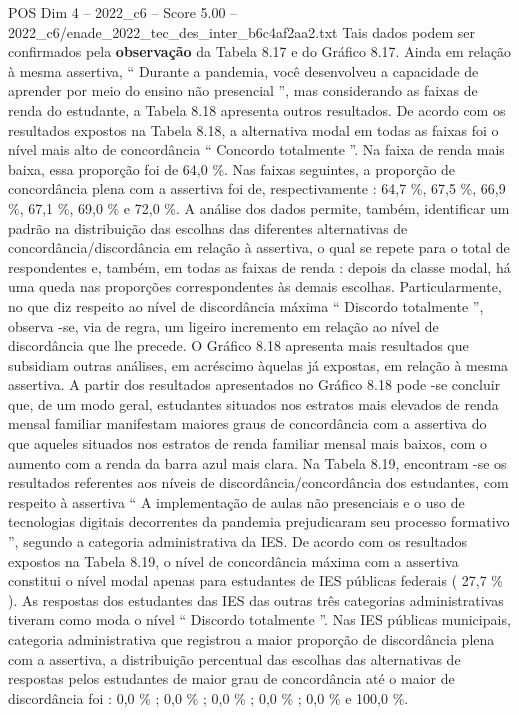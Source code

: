 \begin{textsample}{POS Dim 4 – 2022\_c6 – Score 5.00 – 2022\_c6/enade\_2022\_tec\_des\_inter\_b6c4af2aa2.txt}
Tais dados podem ser confirmados pela \textbf{observação} da Tabela 8.17 e do Gráfico 8.17.
Ainda em relação à mesma assertiva, “ Durante a pandemia, você desenvolveu a capacidade de aprender por meio do ensino não presencial ”, mas considerando as faixas de renda do estudante, a Tabela 8.18 apresenta outros resultados.
De acordo com os resultados expostos na Tabela 8.18, a alternativa modal em todas as faixas foi o nível mais alto de concordância “ Concordo totalmente ”.
Na faixa de renda mais baixa, essa proporção foi de 64,0 \%.
Nas faixas seguintes, a proporção de concordância plena com a assertiva foi de, respectivamente : 64,7 \%, 67,5 \%, 66,9 \%, 67,1 \%, 69,0 \% e 72,0 \%.
A análise dos dados permite, também, identificar um padrão na distribuição das escolhas das diferentes alternativas de concordância/discordância em relação à assertiva, o qual se repete para o total de respondentes e, também, em todas as faixas de renda : depois da classe modal, há uma queda nas proporções correspondentes às demais escolhas.
Particularmente, no que diz respeito ao nível de discordância máxima “ Discordo totalmente ”, observa -se, via de regra, um ligeiro incremento em relação ao nível de discordância que lhe precede.
O Gráfico 8.18 apresenta mais resultados que subsidiam outras análises, em acréscimo àquelas já expostas, em relação à mesma assertiva.
A partir dos resultados apresentados no Gráfico 8.18 pode -se concluir que, de um modo geral, estudantes situados nos estratos mais elevados de renda mensal familiar manifestam maiores graus de concordância com a assertiva do que aqueles situados nos estratos de renda familiar mensal mais baixos, com o aumento com a renda da barra azul mais clara.
Na Tabela 8.19, encontram -se os resultados referentes aos níveis de discordância/concordância dos estudantes, com respeito à assertiva “ A implementação de aulas não presenciais e o uso de tecnologias digitais decorrentes da pandemia prejudicaram seu processo formativo ”, segundo a categoria administrativa da IES.
De acordo com os resultados expostos na Tabela 8.19, o nível de concordância máxima com a assertiva constitui o nível modal apenas para estudantes de IES públicas federais ( 27,7 \% ).
As respostas dos estudantes das IES das outras três categorias administrativas tiveram como moda o nível “ Discordo totalmente ”.
Nas IES públicas municipais, categoria administrativa que registrou a maior proporção de discordância plena com a assertiva, a distribuição percentual das escolhas das alternativas de respostas pelos estudantes de maior grau de concordância até o maior de discordância foi : 0,0 \% ; 0,0 \% ; 0,0 \% ; 0,0 \% ; 0,0 \% e 100,0 \%.

\end{textsample}
